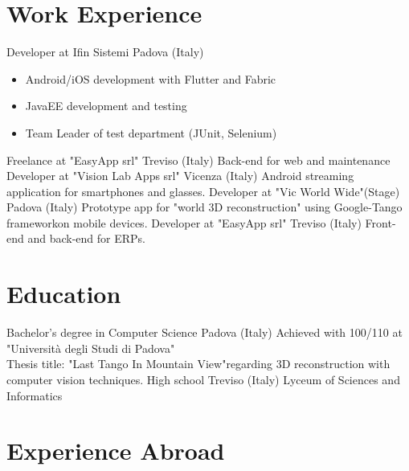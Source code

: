 \documentclass[letterpaper]{twentysecondcv} %
\begin{document}
\section{Work Experience}

\begin{twenty} %
		{Developer at Ifin Sistemi\footnotemarkA[8]} {Padova (Italy)}
		{\begin{itemize}[noitemsep,nolistsep]
				\item Android/iOS development with Flutter and Fabric
				\item JavaEE development and testing
				\item Team Leader of test department (JUnit, Selenium)
			\end{itemize}
		}
		{Freelance at "EasyApp srl"\footnotemarkA[7]} {Treviso (Italy)}
		{Back-end for web and maintenance}
		{Developer at "Vision Lab Apps srl"\footnotemarkA[4]}	{Vicenza (Italy)}
		{Android streaming application for smartphones and glasses.}
		{Developer at "Vic World Wide"\footnotemarkA[5] (Stage)}	{Padova (Italy)}
		{Prototype app for "world 3D reconstruction" using Google-Tango framework\footnotemarkA[6] on mobile devices.}
		{Developer at "EasyApp srl"\footnotemarkA[7]}	{Treviso (Italy)}
		{Front-end and back-end for ERPs.}
\end{twenty}

\section{Education}

\begin{twenty} %
		{Bachelor's degree in Computer Science}	{Padova (Italy)}
		{Achieved with 100/110 at "Università degli Studi di Padova"\footnotemarkA[2]\\
		Thesis title: "Last Tango In Mountain View"\footnotemarkA[3] regarding 3D reconstruction with computer vision techniques.}
		{High school}	{Treviso (Italy)}
		{Lyceum of Sciences and Informatics}
\end{twenty}

\section{Experience Abroad}  
\end{document}
